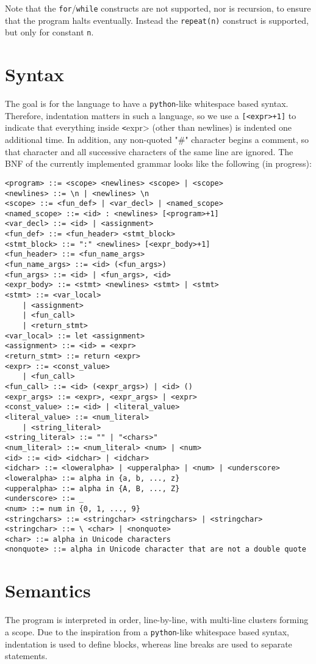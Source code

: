 \documentclass{article}
\begin{document}
Note that the \texttt{for}/\texttt{while} constructs are not supported, nor is recursion, to ensure that the program halts eventually. Instead the \texttt{repeat(n)} construct is supported, but only for constant \texttt{n}.

\section{Syntax}
The goal is for the language to have a \texttt{python}-like whitespace based syntax. Therefore, indentation matters in such a language, so we use a \texttt{[<expr>+1]} to indicate that everything inside \texttt <expr> (other than newlines) is indented one additional time. In addition, any non-quoted "\#" character begins a comment, so that character and all successive characters of the same line are ignored. The BNF of the currently implemented grammar looks like the following (in progress):

\begin{lstlisting}
<program> ::= <scope> <newlines> <scope> | <scope>
<newlines> ::= \n | <newlines> \n
<scope> ::= <fun_def> | <var_decl> | <named_scope>
<named_scope> ::= <id> : <newlines> [<program>+1]
<var_decl> ::= <id> | <assignment>
<fun_def> ::= <fun_header> <stmt_block>
<stmt_block> ::= ":" <newlines> [<expr_body>+1]
<fun_header> ::= <fun_name_args>
<fun_name_args> ::= <id> (<fun_args>)
<fun_args> ::= <id> | <fun_args>, <id>
<expr_body> ::= <stmt> <newlines> <stmt> | <stmt>
<stmt> ::= <var_local> 
    | <assignment>
    | <fun_call> 
    | <return_stmt>
<var_local> ::= let <assignment>
<assignment> ::= <id> = <expr>
<return_stmt> ::= return <expr>
<expr> ::= <const_value>
    | <fun_call>
<fun_call> ::= <id> (<expr_args>) | <id> ()
<expr_args> ::= <expr>, <expr_args> | <expr>
<const_value> ::= <id> | <literal_value>
<literal_value> ::= <num_literal> 
    | <string_literal> 
<string_literal> ::= "" | "<chars>"
<num_literal> ::= <num_literal> <num> | <num>
<id> ::= <id> <idchar> | <idchar>
<idchar> ::= <loweralpha> | <upperalpha> | <num> | <underscore>
<loweralpha> ::= alpha in {a, b, ..., z}
<upperalpha> ::= alpha in {A, B, ..., Z}
<underscore> ::= _
<num> ::= num in {0, 1, ..., 9}
<stringchars> ::= <stringchar> <stringchars> | <stringchar>
<stringchar> ::= \ <char> | <nonquote>
<char> ::= alpha in Unicode characters
<nonquote> ::= alpha in Unicode character that are not a double quote
\end{lstlisting}


\section{Semantics}
The program is interpreted in order, line-by-line, with multi-line clusters forming a scope. Due to the inspiration from a \texttt{python}-like whitespace based syntax, indentation is used to define blocks, whereas line breaks are used to separate statements.
\end{document}
